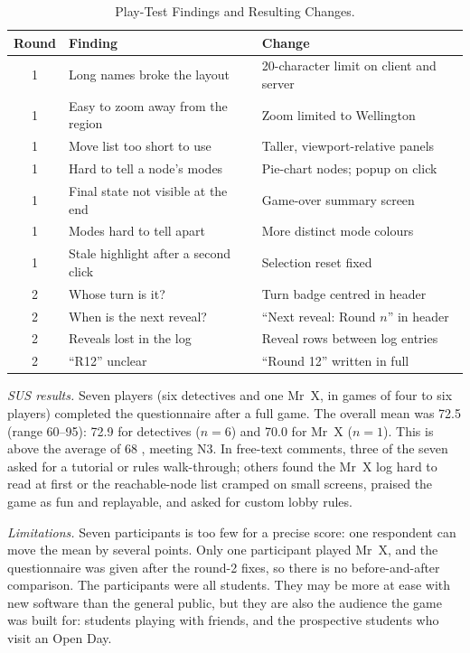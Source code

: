 \documentclass[lettersize,journal]{IEEEtran}
\begin{document}
\begin{table}[!t]
\caption{Play-Test Findings and Resulting Changes.}
\label{tab:feedback}
\centering
\small
\begin{tabular}{@{}cp{}p{}@{}}
\toprule
Round & Finding & Change \\
\midrule
1 & Long names broke the layout & 20-character limit on client and server \\
1 & Easy to zoom away from the region & Zoom limited to Wellington \\
1 & Move list too short to use & Taller, viewport-relative panels \\
1 & Hard to tell a node's modes & Pie-chart nodes; popup on click \\
1 & Final state not visible at the end & Game-over summary screen \\
1 & Modes hard to tell apart & More distinct mode colours \\
1 & Stale highlight after a second click & Selection reset fixed \\
2 & Whose turn is it? & Turn badge centred in header \\
2 & When is the next reveal? & ``Next reveal: Round $n$'' in header \\
2 & Reveals lost in the log & Reveal rows between log entries \\
2 & ``R12'' unclear & ``Round 12'' written in full \\
\bottomrule
\end{tabular}
\end{table}

\emph{SUS results.} Seven players (six detectives and one Mr~X, in games of four to six players) completed the questionnaire after a full game. The overall mean was 72.5 (range 60--95): 72.9 for detectives ($n=6$) and 70.0 for Mr~X ($n=1$). This is above the average of 68 \cite{sauro2011sus}, meeting N3. In free-text comments, three of the seven asked for a tutorial or rules walk-through; others found the Mr~X log hard to read at first or the reachable-node list cramped on small screens, praised the game as fun and replayable, and asked for custom lobby rules.

\emph{Limitations.} Seven participants is too few for a precise score: one respondent can move the mean by several points. Only one participant played Mr~X, and the questionnaire was given after the round-2 fixes, so there is no before-and-after comparison. The participants were all students. They may be more at ease with new software than the general public, but they are also the audience the game was built for: students playing with friends, and the prospective students who visit an Open Day.
\end{document}
